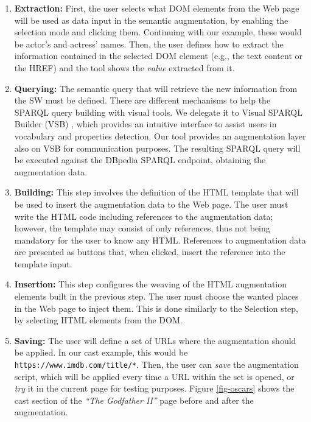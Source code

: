 \documentclass[runningheads,anonymous]{llncs}
\begin{document}
\begin{enumerate}
  \item \textbf{Extraction:} First, the user selects what DOM elements from the Web page will be used as data input in the semantic augmentation, by enabling the selection mode and clicking them. Continuing with our example, these would be actor's and actress' names. Then, the user defines how to extract the information contained in the selected DOM element (e.g., the text content or the HREF) and the tool shows the \textit{value} extracted from it.
  
  \item \textbf{Querying:} The semantic query that will retrieve the new information from the SW must be defined. There are different mechanisms to help the SPARQL query building with visual tools. We delegate it to Visual SPARQL Builder (VSB) \cite{mci/Eipert2015}, which provides an intuitive interface to assist users in vocabulary and properties detection.
  Our tool provides an augmentation layer also on VSB for communication purposes. The resulting SPARQL query will be executed against the DBpedia SPARQL endpoint, obtaining the augmentation data.

  \item \textbf{Building:} This step involves the definition of the HTML template that will be used to insert the augmentation data to the Web page. The user must write the HTML code including references to the augmentation data; however, the template may consist of only references, thus not being mandatory for the user to know any HTML. References to augmentation data are presented as buttons that, when clicked, insert the reference into the template input.
  
  \item \textbf{Insertion:} This step configures the weaving of the HTML augmentation elements built in the previous step. The user must choose the wanted places in the Web page to inject them. This is done similarly to the Selection step, by selecting HTML elements from the DOM.
  
  \item \textbf{Saving:} The user will define a set of URLs where the augmentation should be applied. In our cast example, this would be \texttt{https://www.imdb.com/title/*}. Then, the user can \textit{save} the augmentation script, which will be applied every time a URL within the set is opened, or \textit{try} it in the current page for testing purposes. Figure \ref{fig-oscars} shows the cast section of the \textit{``The Godfather II''} page before and after the augmentation.
\end{enumerate}
\end{document}
